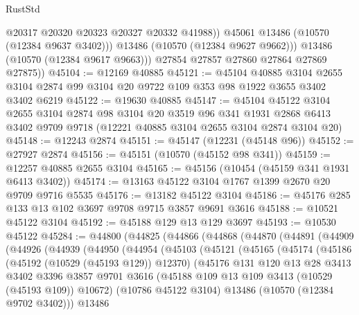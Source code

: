 \begin{lexlean}{RustStd}
\begin{coremodule}
                  @20317
                  @20320
                  @20323
                  @20327
                  @20332
                  @41988))
              @45061
              @13486
              (@10570 (@12384 @9637 @3402)))
            @13486
            (@10570 (@12384 @9627 @9662)))
          @13486
          (@10570 (@12384 @9617 @9663)))
        @27854
        @27857
        @27860
        @27864
        @27869
        @27875))
@45104 := @12169 @40885
@45121 := @45104
    @40885
    @3104
    @2655
    @3104
    @2874
    @99
    @3104
    @20
    @9722
    @109
    @353
    @98
    @1922
    @3655
    @3402
    @3402
    @6219
@45122 := @19630 @40885
@45147 := @45104
    @45122
    @3104
    @2655
    @3104
    @2874
    @98
    @3104
    @20
    @3519
    @96
    @341
    @1931
    @2868
    @6413
    @3402
    @9709
    @9718
    (@12221 @40885 @3104 @2655 @3104 @2874 @3104 @20)
@45148 := @12243 @2874
@45151 := @45147 (@12231 (@45148 @96))
@45152 := @27927 @2874
@45156 := @45151 (@10570 (@45152 @98 @341))
@45159 := @12257 @40885 @2655 @3104
@45165 := @45156 (@10454 (@45159 @341 @1931 @6413 @3402))
@45174 := @13163 @45122 @3104 @1767 @1399 @2670 @20 @9709 @9716 @5535
@45176 := @13182 @45122 @3104
@45186 := @45176 @285 @133 @13 @102 @3697 @9708 @9715 @3857 @9691 @3616
@45188 := @10521 @45122 @3104
@45192 := @45188 @129 @13 @129 @3697
@45193 := @10530 @45122
@45284 := @44800
    (@44825
      (@44866
        (@44868
          (@44870
            (@44891
              (@44909
                (@44926
                  (@44939
                    (@44950
                      (@44954
                        (@45103
                          (@45121
                            (@45165
                              (@45174
                                (@45186
                                  (@45192 (@10529 (@45193 @129)) @12370)
                                  (@45176
                                    @131
                                    @120
                                    @13
                                    @28
                                    @3413
                                    @3402
                                    @3396
                                    @3857
                                    @9701
                                    @3616
                                    (@45188 @109 @13 @109 @3413 (@10529 (@45193 @109)) @10672)
                                    (@10786 @45122 @3104)
                                    @13486
                                    (@10570 (@12384 @9702 @3402)))
                                  @13486

\end{coremodule}
\end{lexlean}

